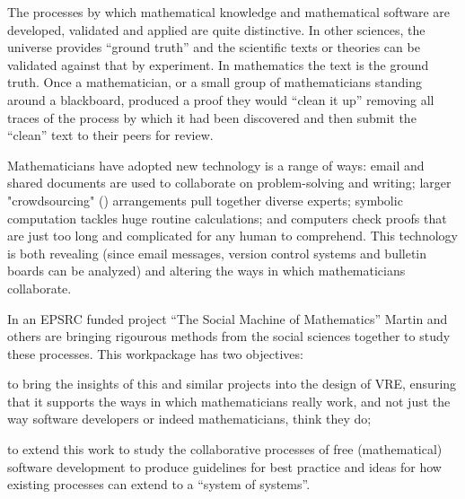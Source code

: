 \begin{workpackage}[id=social-aspects,wphases=0-48,
  title=Social Aspects,
  lead=UO,
  UORM=53,USHRM=8, USORM=5]


\begin{wpobjectives}

The processes by which mathematical knowledge and mathematical
software are developed, validated and applied are quite
distinctive. In other sciences, the universe provides ``ground truth''
and the scientific texts or theories can be validated against that by
experiment. In mathematics the text is the ground truth. Once 
 a mathematician, or a small group of
mathematicians standing around a blackboard, produced a proof they
would ``clean it up'' removing all traces of the process by which it
had been discovered and then submit the ``clean'' text to their peers
for review. 

Mathematicians have adopted new technology is a range of ways: email
and shared documents are used to collaborate on problem-solving and
writing; larger "crowdsourcing" () arrangements
pull together diverse  experts; symbolic computation tackles huge routine
calculations; and computers  check  proofs that are just too long and 
complicated for any human to comprehend. This technology is both
revealing (since email messages, version control systems and bulletin
boards can be analyzed) and altering the ways in which mathematicians
collaborate. 

In an EPSRC funded project ``The Social Machine of Mathematics''
Martin and others are bringing rigourous methods from the social 
sciences together to study these processes. This workpackage has two
objectives: \begin{compactitem}
\item to bring the insights of this and similar projects into the
  design of \TheProject VRE, ensuring that it supports the ways in
  which mathematicians really work, and not just the way software
  developers or indeed mathematicians, think they do;
\item to extend this work to study the collaborative processes of free
  (mathematical) software development to produce guidelines for best
  practice and ideas for how existing processes can extend to a
  ``system of systems''.
\item {}
\end{compactitem} 




\end{wpobjectives}
\end{workpackage}
